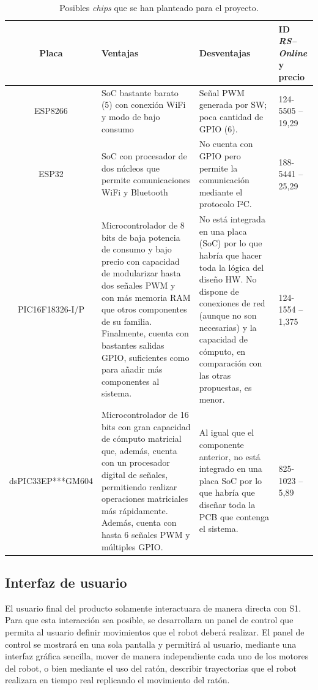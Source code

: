 \begin{table}[H]
    \centering
    \begin{tabularx}{\textwidth}{| c | X | X | X |}
        \hline
        \textbf{Placa} & \textbf{Ventajas} & \textbf{Desventajas} & \textbf{ID \textit{RS--Online} y precio} \\
        \hline
        ESP8266 & \ac{SoC} bastante barato (5\EUR{}) con conexión WiFi y modo de bajo consumo & Señal \ac{PWM} generada por \ac{SW}; poca cantidad de \ac{GPIO} (6). & 124-5505 -- 19,29\EUR{} \\
        \hline
        ESP32 & \ac{SoC} con procesador de dos núcleos que permite comunicaciones WiFi y Bluetooth & No cuenta con \ac{GPIO} pero permite la comunicación mediante el protocolo I²C. & 188-5441 -- 25,29\EUR{} \\
        \hline
        PIC16F18326-I/P & Microcontrolador de 8 bits de baja potencia de consumo y bajo precio con capacidad de modularizar hasta dos señales \ac{PWM} y con más memoria RAM que otros componentes de su familia. Finalmente, cuenta con bastantes salidas \ac{GPIO}, suficientes como para añadir más componentes al sistema. & No está integrada en una placa (\ac{SoC}) por lo que habría que hacer toda la lógica del diseño \ac{HW}. No dispone de conexiones de red (aunque no son necesarias) y la capacidad de cómputo, en comparación con las otras propuestas, es menor. & 124-1554 -- 1,375\EUR{} \\
        \hline
        dsPIC33EP***GM604 & Microcontrolador de 16 bits con gran capacidad de cómputo matricial que, además, cuenta con un procesador digital de señales, permitiendo realizar operaciones matriciales más rápidamente. Además, cuenta con hasta 6 señales \ac{PWM} y múltiples GPIO. & Al igual que el componente anterior, no está integrado en una placa \ac{SoC} por lo que habría que diseñar toda la PCB que contenga el sistema. & 825-1023 -- 5,89\EUR{} \\
        \hline
    \end{tabularx}
    \caption{Posibles \textit{chips} que se han planteado para el proyecto.}
    \label{tab:s2_chips}
\end{table}


\subsection{Interfaz de usuario}

El usuario final del producto solamente interactuara de manera directa con \ac{S1}.
Para que esta interacción sea posible, se desarrollara un panel de control que permita al usuario definir movimientos que el robot deberá realizar. El panel de control se mostrará en una sola pantalla y permitirá al usuario, mediante una interfaz gráfica sencilla, mover de manera independiente cada uno de los motores del robot, o bien mediante el uso del ratón, describir trayectorias que el robot realizara en tiempo real replicando el movimiento del ratón.

